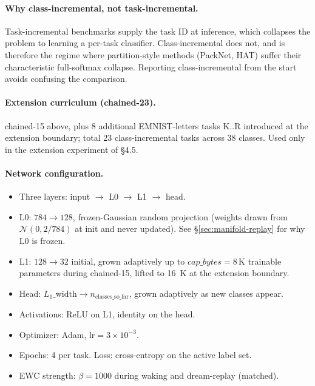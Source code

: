 \documentclass[11pt]{article}
\begin{document}
\paragraph{Why class-incremental, not task-incremental.}
Task-incremental benchmarks supply the task ID at inference, which
collapses the problem to learning a per-task classifier.
Class-incremental does not, and is therefore the regime where
partition-style methods (PackNet, HAT) suffer their characteristic
full-softmax collapse. Reporting class-incremental from the start avoids
confusing the comparison.

\paragraph{Extension curriculum (chained-23).}
chained-15 above, plus 8 additional EMNIST-letters tasks K..R introduced
at the extension boundary; total 23 class-incremental tasks across 38
classes. Used only in the extension experiment of \S4.5.

\paragraph{Network configuration.}
\begin{itemize}[leftmargin=1.5em]
  \item Three layers: input $\to$ L0 $\to$ L1 $\to$ head.
  \item L0: $784 \to 128$, frozen-Gaussian random projection (weights
        drawn from $\mathcal{N}(0, 2/784)$ at init and never updated). See
        \S\ref{sec:manifold-replay} for why L0 is frozen.
  \item L1: $128 \to 32$ initial, grown adaptively up to
        $\textit{cap\_bytes} = 8\,\text{K}$ trainable parameters during
        chained-15, lifted to 16~K at the extension boundary.
  \item Head: $L_1\text{\_width} \to n_{\text{classes\_so\_far}}$, grown
        adaptively as new classes appear.
  \item Activations: ReLU on L1, identity on the head.
  \item Optimizer: Adam, $\text{lr} = 3 \times 10^{-3}$.
  \item Epochs: 4 per task. Loss: cross-entropy on the active label set.
  \item EWC strength: $\beta = 1000$ during waking and dream-replay
        (matched).
\end{itemize}
\end{document}
